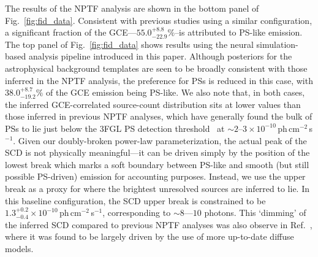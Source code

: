 \documentclass[prd,aps,10pt,nofootinbib,twocolumn,superscriptaddress,preprintnumbers,balancelastpage,longbibliography]{revtex4-1}
\begin{document}
The results of the NPTF analysis are shown in the bottom panel of Fig.~\ref{fig:fid_data}. Consistent with previous studies using a similar configuration, a significant fraction of the GCE---$55.0^{+8.8}_{-22.9}\%$--is attributed to PS-like emission.
The top panel of Fig.~\ref{fig:fid_data} shows results using the neural simulation-based analysis pipeline introduced in this paper. Although posteriors for the astrophysical background templates are seen to be broadly consistent with those inferred in the NPTF analysis, the preference for PSs is reduced in this case, with $38.0^{+8.7}_{-19.2}\%$ of the GCE emission being PS-like. We also note that, in both cases, the inferred GCE-correlated source-count distribution sits at lower values than those inferred in previous NPTF analyses, which have generally found the bulk of PSs to lie just below the 3FGL PS detection threshold~\cite{Lee:2015fea} at $\sim2$--$3\times 10^{-10}$\,ph\,cm$^{-2}$\,s$^{-1}$. Given our doubly-broken power-law parameterization, the actual peak of the SCD is not physically meaningful---it can be driven simply by the position of the lowest break which marks a soft boundary between PS-like and smooth (but still possible PS-driven) emission for accounting purposes. Instead, we use the upper break as a proxy for where the brightest unresolved sources are inferred to lie. In this baseline configuration, the SCD upper break is constrained to be $1.3^{+0.2}_{-0.4}\times 10^{-10}$\,ph\,cm$^{-2}$\,s$^{-1}$, corresponding to $\sim8$---$10$ photons. This `dimming' of the inferred SCD compared to previous NPTF analyses was also observe in Ref.~\cite{List:2021aer}, where it was found to be largely driven by the use of more up-to-date diffuse models.
\end{document}

